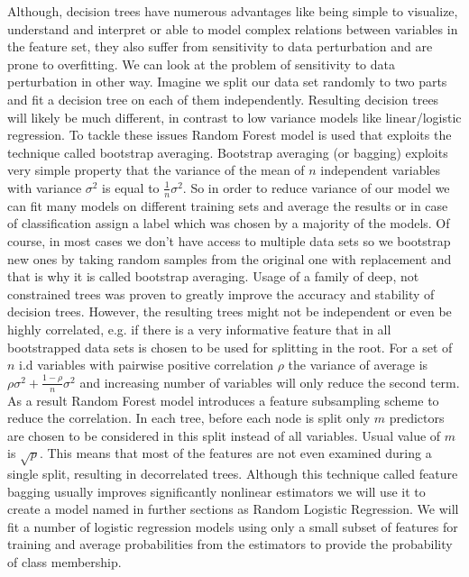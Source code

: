 \documentclass[shortabstract, english, mgr]{iithesis}
\begin{document}
Although, decision trees have numerous advantages like being simple to visualize, understand and interpret or able to model complex relations between variables in the feature set, they also suffer from sensitivity to data perturbation and are prone to overfitting. We can look at the problem of sensitivity to data perturbation in other way. Imagine we split our data set randomly to two parts and fit a decision tree on each of them independently. Resulting decision trees will likely be much different, in contrast to low variance models like linear/logistic regression. To tackle these issues Random Forest model is used that exploits the technique called bootstrap averaging. Bootstrap averaging (or bagging) exploits very simple property that the variance of the mean of $n$ independent variables with variance $\sigma^2$ is equal to $\frac{1}{n}\sigma^2$. So in order to reduce variance of our model we can fit many models on different training sets and average the results or in case of classification assign a label which was chosen by a majority of the models. Of course, in most cases we don't have access to multiple data sets so we bootstrap new ones by taking random samples from the original one with replacement and that is why it is called bootstrap averaging. Usage of a family of deep, not constrained trees was proven to greatly improve the accuracy and stability of decision trees. However, the resulting trees might not be independent or even be highly correlated, e.g. if there is a very informative feature that in all bootstrapped data sets is chosen to be used for splitting in the root. For a set of $n$ i.d variables with pairwise positive correlation $\rho$ the variance of average is $\rho \sigma^2 + \frac{1-\rho}{n}\sigma^2$ and increasing number of variables will only reduce the second term. As a result Random Forest model introduces a feature subsampling scheme to reduce the correlation. In each tree, before each node is split only $m$ predictors are chosen to be considered in this split instead of all variables. Usual value of $m$ is  $\sqrt{p}$. This means that most of the features are not even examined during a single split, resulting in decorrelated trees. Although this technique called feature bagging usually improves significantly nonlinear estimators we will use it to create a model named in further sections as Random Logistic Regression. We will fit a number of logistic regression models using only a small subset of features for training and average probabilities from the estimators to provide the probability of class membership.
\end{document}
